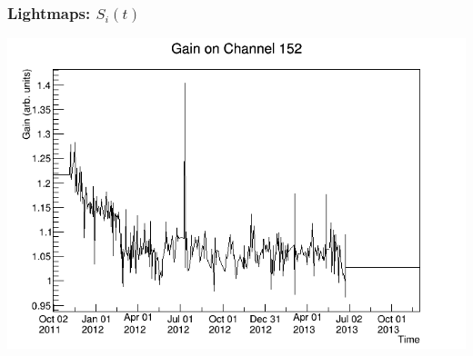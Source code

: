 \documentclass{beamer}
\begin{document}
\begin{frame}
\begin{center}
\frametitle{Lightmaps: $S_i(t)$}
\end{center}
\vspace{0.5cm}
\begin{center}
\includegraphics[keepaspectratio=true,width=\textwidth,clip=true,trim=5mm 0mm 20mm 15mm]{gainfunc_152.png}
\end{center}
\end{frame}
\end{document}
